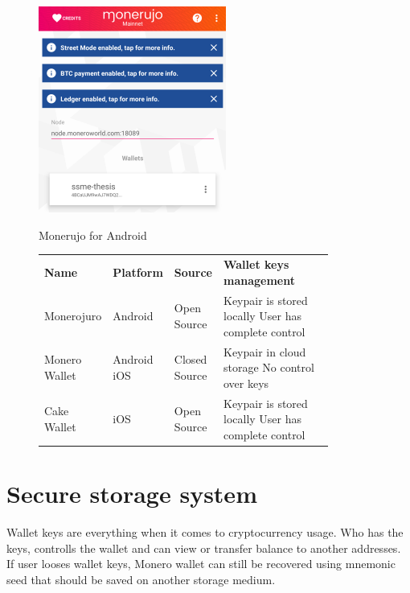 \documentclass[
  printed, %
  table,   %
  nolof,     %
  nolot,     %
           oneside, color
]{fithesis3}
\begin{document}
\begin{figure}[H]
\begin{center}
\vspace{-0.75em}
 \includegraphics[trim={0 1.8cm 0 0},clip,width=0.55\textwidth]{Screenshot_1542566492.png}
    \caption{Monerujo for Android}
    \vspace{-1.5em}
    \label{pic:withoutresdrawable}
\end{center}
    \end{figure}
 \vspace{-0.9em}
\begin{figure}[H]
\centering\begin{tabular}{p{0.2\linewidth}p{0.15\linewidth}p{0.1\linewidth}p{0.4\linewidth}}
\textbf{Name}         & \textbf{Platform}      & \textbf{Source}        & \textbf{Wallet keys management} \\
Monerojuro    & Android       & Open Source   & Keypair is stored locally  User has complete control                       \\
Monero Wallet & Android  iOS & Closed Source & Keypair in cloud storage No control over keys \\
Cake Wallet   & iOS           & Open Source   & Keypair is stored locally  User has complete control                            
\end{tabular}
\label{table:monero-mobile}
\end{figure}


\section{Secure storage system}
Wallet keys are everything when it comes to cryptocurrency usage. Who has the keys, controlls the wallet and can view or transfer balance to another addresses. If user looses wallet keys, Monero wallet can still be recovered using mnemonic seed that should be saved on another storage medium. 
\end{document}
